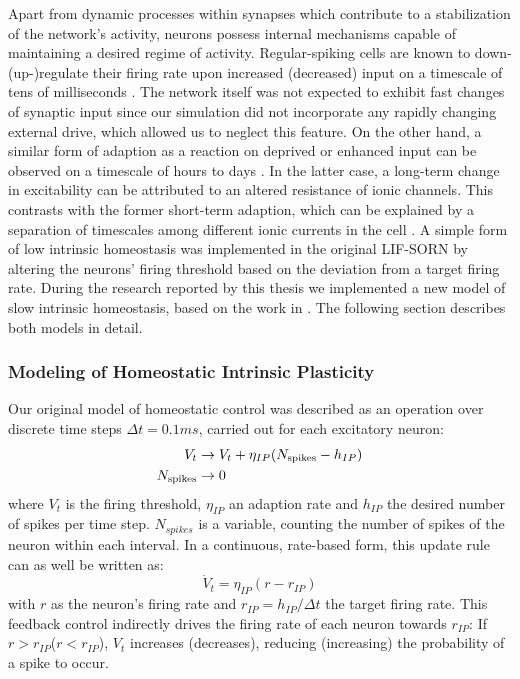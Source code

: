 \documentclass[10pt,a4paper]{article}
\begin{document}
Apart from dynamic processes within synapses which contribute to a stabilization of the network's activity, neurons possess internal mechanisms capable of maintaining a desired regime of activity. Regular-spiking cells are known to down-(up-)regulate their firing rate upon increased (decreased) input on a timescale of tens of milliseconds \cite{Connors_Gutnick_Spike_Patterns,Benda_Herz_Spike_Frequ_Adaption}. The network itself was not expected to exhibit fast changes of synaptic input since our simulation did not incorporate any rapidly changing external drive, which allowed us to neglect this feature. On the other hand, a similar form of adaption as a reaction on deprived or enhanced input can be observed on a timescale of hours to days \cite{Desai_IP}. In the latter case, a long-term change in excitability can be attributed to an altered resistance of ionic channels. This contrasts with the former short-term adaption, which can be explained by a separation of timescales among different ionic currents in the cell \cite[p.~252--256]{Izhikevich_Dynsys}. A simple form of low intrinsic homeostasis was implemented in the original LIF-SORN by altering the neurons' firing threshold based on the deviation from a target firing rate. During the research reported by this thesis we implemented a new model of slow intrinsic homeostasis, based on the work in \cite{Sweeney_Paper}. The following section describes both models in detail.
\subsubsection{Modeling of Homeostatic Intrinsic Plasticity}
Our original model of homeostatic control was described as an operation over discrete time steps $\Delta t = 0.1ms$, carried out for each excitatory neuron:
\begin{align}
V_t &\rightarrow V_t + \eta_{IP} (N_{\rm spikes} - h_{IP}) \label{can_hom_1}\\
N_{\rm spikes} &\rightarrow 0 \label{can_hom_2}
\end{align}
where $V_t$ is the firing threshold, $\eta_{IP}$ an adaption rate and $h_{IP}$ the desired number of spikes per time step. $N_{spikes}$ is a variable, counting the number of spikes of the neuron within each interval. In a continuous, rate-based form, this update rule can as well be written as:
\begin{equation}
\dot{V}_t = \eta_{IP}(r-r_{IP}) \label{can_hom_rate}
\end{equation}
with $r$ as the neuron's firing rate and $r_{IP}=h_{IP}/\Delta t$ the target firing rate. This feedback control indirectly drives the firing rate of each neuron towards $r_{IP}$: If $r>r_{IP}$($r<r_{IP}$), $V_t$ increases (decreases), reducing (increasing) the probability of a spike to occur. 
\end{document}

